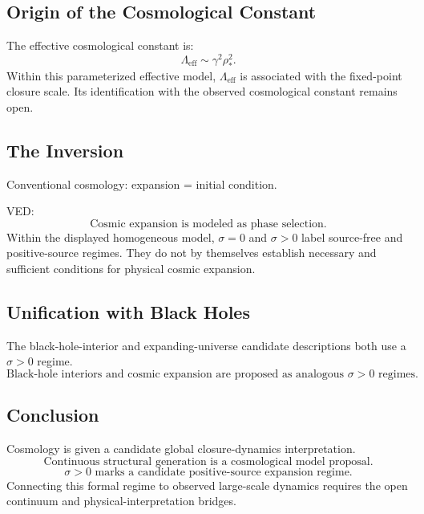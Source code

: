 \subsection{Origin of the Cosmological Constant}

The effective cosmological constant is:
\begin{equation}
  \label{eq:lambda_eff}
  \boxed{\Lambda_{\text{eff}} \sim \gamma^2\rho_*^2.}
\end{equation}
Within this parameterized effective model, $\Lambda_{\text{eff}}$ is associated
with the fixed-point closure scale. Its identification with the observed
cosmological constant remains open.

\subsection{The Inversion}

Conventional cosmology: expansion = initial condition.

VED:
\begin{equation}
  \boxed{\text{Cosmic expansion is modeled as phase selection.}}
\end{equation}
Within the displayed homogeneous model, $\sigma=0$ and $\sigma>0$ label
source-free and positive-source regimes. They do not by themselves establish
necessary and sufficient conditions for physical cosmic expansion.

\subsection{Unification with Black Holes}

The black-hole-interior and expanding-universe candidate descriptions both
use a $\sigma>0$ regime.
\begin{equation}
  \boxed{
    \text{Black-hole interiors and cosmic expansion are proposed as
    analogous } \sigma>0 \text{ regimes.}
  }
\end{equation}

\subsection{Conclusion}

Cosmology is given a candidate global closure-dynamics interpretation.
\begin{equation}
  \boxed{\text{Continuous structural generation is a cosmological model proposal.}}
\end{equation}
\begin{equation}
  \boxed{\sigma>0\text{ marks a candidate positive-source expansion regime.}}
\end{equation}
Connecting this formal regime to observed large-scale dynamics requires the
open continuum and physical-interpretation bridges.
